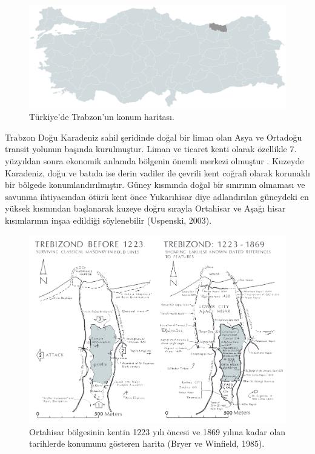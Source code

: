 \documentclass[12pt,turkish,a4paperpaper,]{report}
\begin{document}
\begin{figure}
\centering
\includegraphics[width=1\textwidth,height=\textheight]{source/figures/TrabzonTurkiye.png}
\caption{Türkiye'de Trabzon'un konum haritası.}
\end{figure}

Trabzon Doğu Karadeniz sahil şeridinde doğal bir liman olan Asya ve
Ortadoğu transit yolunun başında kurulmuştur. Liman ve ticaret kenti
olarak özellikle 7. yüzyıldan sonra ekonomik anlamda bölgenin önemli
merkezi olmuştur . Kuzeyde Karadeniz, doğu ve batıda ise derin vadiler
ile çevrili kent coğrafi olarak korunaklı bir bölgede
konumlandırılmıştır. Güney kısmında doğal bir sınırının olmaması ve
savunma ihtiyacından ötürü kent önce Yukarıhisar diye adlandırılan
güneydeki en yüksek kısmından başlanarak kuzeye doğru sırayla Ortahisar
ve Aşağı hisar kısımlarının inşaa edildiği söylenebilir (Uspenski,
2003).

\begin{figure}
\centering
\includegraphics[width=1\textwidth,height=\textheight]{source/figures/TrabzonMap.png}
\caption{Ortahisar bölgesinin kentin 1223 yılı öncesi ve 1869 yılına
kadar olan tarihlerde konumunu gösteren harita (Bryer ve Winfield,
1985).}
\end{figure}
\end{document}
